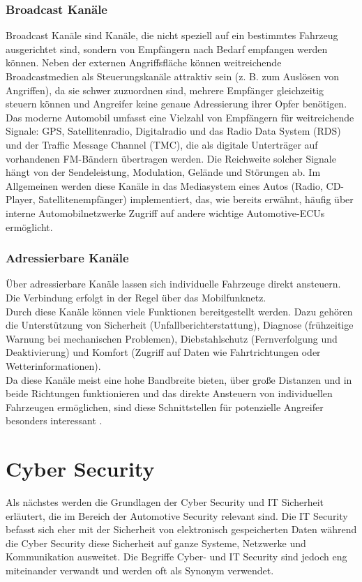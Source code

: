 \subsubsection{Broadcast Kanäle}
Broadcast Kanäle sind Kanäle, die nicht speziell auf ein bestimmtes Fahrzeug ausgerichtet sind, sondern von Empfängern nach Bedarf empfangen werden können. Neben der externen Angriffsfläche können weitreichende Broadcastmedien als Steuerungskanäle attraktiv sein (z. B. zum Auslösen von Angriffen), da sie schwer zuzuordnen sind, mehrere Empfänger gleichzeitig steuern können und Angreifer keine genaue Adressierung ihrer Opfer benötigen.
Das moderne Automobil umfasst eine Vielzahl von Empfängern für weitreichende Signale: \ac{GPS}, Satellitenradio, Digitalradio und das Radio Data System (RDS) und der Traffic Message Channel (TMC), die als digitale Unterträger auf vorhandenen FM-Bändern übertragen werden. Die Reichweite solcher Signale hängt von der Sendeleistung, Modulation, Gelände und Störungen ab. Im Allgemeinen werden diese Kanäle in das Mediasystem eines Autos (Radio, CD-Player, Satellitenempfänger) implementiert, das, wie bereits erwähnt, häufig über interne Automobilnetzwerke Zugriff auf andere wichtige Automotive-ECUs ermöglicht. \cite[4\psq]{Checkoway.2011}

\subsubsection{Adressierbare Kanäle}
Über adressierbare Kanäle lassen sich individuelle Fahrzeuge direkt ansteuern. Die Verbindung erfolgt in der Regel über das Mobilfunknetz.\\
Durch diese Kanäle können viele Funktionen bereitgestellt werden. Dazu gehören die Unterstützung von Sicherheit (Unfallberichterstattung), Diagnose (frühzeitige Warnung bei mechanischen Problemen), Diebstahlschutz (Fernverfolgung und Deaktivierung) und Komfort (Zugriff auf Daten wie Fahrtrichtungen oder Wetterinformationen). \cite[5]{Checkoway.2011} \\
Da diese Kanäle meist eine hohe Bandbreite bieten, über große Distanzen und in beide Richtungen funktionieren und das direkte Ansteuern von individuellen Fahrzeugen ermöglichen, sind diese Schnittstellen für potenzielle Angreifer besonders interessant \cite[5]{Checkoway.2011}.




\section{Cyber Security}
Als nächstes werden die Grundlagen der Cyber Security und IT Sicherheit erläutert, die im Bereich der Automotive Security relevant sind. Die IT Security befasst sich eher mit der Sicherheit von elektronisch gespeicherten Daten während die Cyber Security diese Sicherheit auf ganze Systeme, Netzwerke und Kommunikation ausweitet.
Die Begriffe Cyber- und IT Security sind jedoch eng miteinander verwandt und werden oft als Synonym verwendet.

